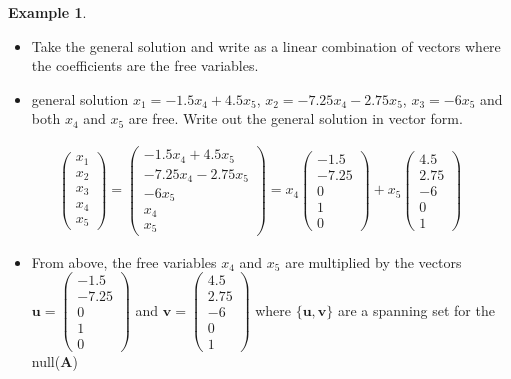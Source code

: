 \documentclass[
]{book}
\providecommand{\tightlist}{%
  \setlength{\itemsep}{0pt}\setlength{\parskip}{0pt}}
\theoremstyle{definition}
\theoremstyle{definition}
\newtheorem{example}{Example}[chapter]
\theoremstyle{definition}
\theoremstyle{remark}
\begin{document}
\begin{example}
\begin{itemize}
\item
  Take the general solution and write as a linear combination of vectors where the coefficients are the free variables.
\item
  general solution \(x_1 = -1.5 x_4 + 4.5 x_5\), \(x_2 = -7.25 x_4 - 2.75 x_5\), \(x_3 = -6 x_5\) and both \(x_4\) and \(x_5\) are free. Write out the general solution in vector form.
\end{itemize}

\[
\begin{aligned}
\begin{pmatrix} x_1 \\ x_2 \\ x_3 \\ x_4 \\ x_5 \end{pmatrix} = \begin{pmatrix} -1.5 x_4 + 4.5 x_5\\ -7.25 x_4 - 2.75 x_5 \\ -6 x_5 \\ x_4 \\ x_5 \end{pmatrix} = x_4 \begin{pmatrix} -1.5 \\ -7.25 \\ 0 \\ 1 \\ 0 \end{pmatrix} + x_5 \begin{pmatrix} 4.5 \\ 2.75 \\ -6 \\ 0 \\ 1 \end{pmatrix}
\end{aligned}
\]

\begin{itemize}
\tightlist
\item
  From above, the free variables \(x_4\) and \(x_5\) are multiplied by the vectors \(\mathbf{u} = \begin{pmatrix} -1.5 \\ -7.25 \\ 0 \\ 1 \\ 0 \end{pmatrix}\) and \(\mathbf{v} = \begin{pmatrix} 4.5 \\ 2.75 \\ -6 \\ 0 \\ 1 \end{pmatrix}\) where \(\{ \mathbf{u}, \mathbf{v} \}\) are a spanning set for the null(\(\mathbf{A}\))
\end{itemize}

\end{example}
\end{document}
